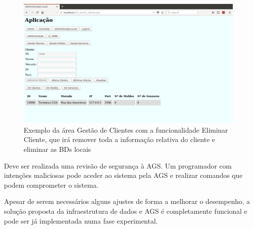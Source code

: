 \documentclass[11pt,twoside,a4paper]{report}
\begin{document}
\begin{figure}[H]
	\begin{center}
		\includegraphics[trim={0 2.5cm 0 0},clip,width=1\textwidth]{futuro01} %
		\caption[Exemplo da área Gestão de Clientes com a funcionalidade Eliminar Cliente]{Exemplo da área Gestão de Clientes com a funcionalidade Eliminar Cliente, que irá remover toda a informação relativa do cliente e eliminar as BDs locais}
		\label{fig:conclusoes5}
	\end{center}
\end{figure}
Deve ser realizada uma revisão de segurança à AGS. Um programador com intenções maliciosas pode aceder ao sistema pela AGS e realizar comandos que podem comprometer o sistema.\par 
Apesar de serem necessários alguns ajustes de forma a melhorar o desempenho, a solução proposta da infraestrutura de dados e AGS é completamente funcional e pode ser já implementada numa fase experimental.

\newpage
\end{document}
